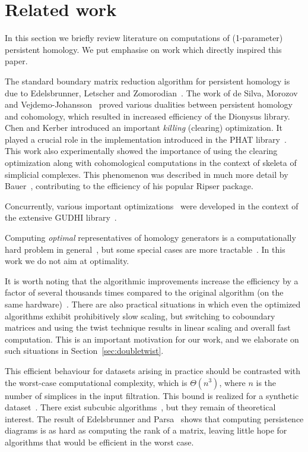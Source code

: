 \section{Related work}
\label{sec:related}
In this section we briefly review literature on computations of (1-parameter) persistent homology. We put emphasise on work which directly inspired this paper.

The standard boundary matrix reduction algorithm for persistent homology is due to Edelsbrunner, Letscher and Zomorodian~\cite{edelsbrunner2000topological}. The work of de Silva, Morozov and Vejdemo-Johansson~\cite{deSilva_2011} proved various dualities between persistent homology and cohomology, which resulted in increased efficiency of the Dionysus library. Chen and Kerber introduced an important \emph{killing} (clearing) optimization. It played a crucial role in the implementation introduced in the PHAT library~\cite{phat}. This work also experimentally showed the importance of using the clearing optimization along with cohomological computations in the context of skeleta of simplicial complexes. This phenomenon was described in much more detail by Bauer~\cite{bauer2021ripser}, contributing to the efficiency of his popular Ripser package.

Concurrently, various important optimizations~\cite{boissonnat2014simplex, clemont_annotation, boissonnat2020edge, boissonnat2021strong} were developed in the context of the extensive GUDHI library~\cite{maria2014gudhi}.

Computing \emph{optimal} representatives of homology generators is a computationally hard problem in general~\cite{chen2011hardness}, but some special cases are more tractable~\cite{tamal_generators, li2021minimal}. In this work we do not aim at optimality.

It is worth noting that the algorithmic improvements increase the efficiency by a factor of several thousands times compared to the original algorithm (on the same hardware)~\cite{phat}. There are also practical situations in which even the optimized algorithms exhibit prohibitively slow scaling, but switching to coboundary matrices and using the twist technique results in linear scaling and overall fast computation. This is an important motivation for our work, and we elaborate on such situations in Section~\ref{sec:doubletwist}.

This efficient behaviour for datasets arising in practice should be contrasted with the worst-case computational complexity, which is $\Theta(n^3)$, where $n$ is the number of simplices in the input filtration. This bound is realized for a synthetic dataset~\cite{morozov2005persistence}. There exist subcubic algorithms~\cite{milosavljevic2011zigzag}, but they remain of theoretical interest. The result of Edelsbrunner and Parsa~\cite{edelsbrunner2014computational} shows that computing persistence diagrams is as hard as computing the rank of a matrix, leaving little hope for algorithms that would be efficient in the worst case.

